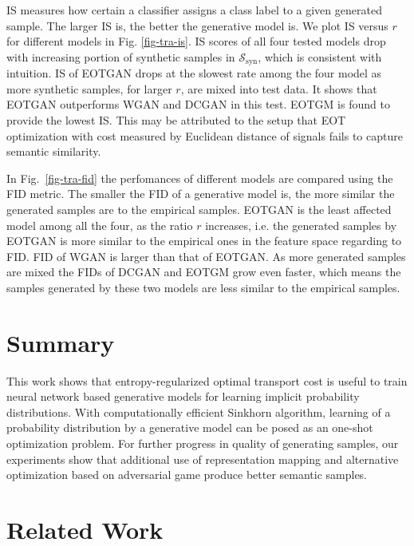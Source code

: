 IS measures how certain a classifier assigns a class label to a given
generated sample. The larger IS is, the better the generative model
is. We plot IS versus $r$ for different models in
Fig. \ref{fig-tra-is}. IS scores of all four tested models drop with
increasing portion of synthetic samples in
$\mathcal{S}_{\mathrm{syn}}$, which is consistent with intuition. IS
of EOTGAN drops at the slowest rate among the four model as more
synthetic samples, for larger $r$, are mixed into test data. It shows
that EOTGAN outperforms WGAN and DCGAN in this test. EOTGM is found to provide the lowest IS.
This may be attributed to the setup that 
EOT optimization with cost measured by Euclidean distance of signals
fails to capture semantic similarity.

In Fig.~\ref{fig-tra-fid} the perfomances of different models are
compared using the FID metric. The smaller the FID of a generative model is, the more similar the
generated samples are to the empirical samples. EOTGAN is the least affected model among all the four, as the ratio $r$ increases, i.e. the generated samples by EOTGAN is more similar to the empirical
ones in the feature space regarding to FID. FID of WGAN is larger than that of EOTGAN. As
more generated samples are mixed the FIDs of DCGAN and EOTGM grow
even faster, which means the samples generated by these two models are
less similar to the empirical samples.
\section{Summary}
This work shows that entropy-regularized optimal transport cost is
useful to train neural network based generative models for learning implicit probability
distributions. With computationally efficient Sinkhorn algorithm,
learning of a probability distribution by a generative model can be
posed as an one-shot optimization problem. For further progress in
quality of generating samples, our experiments show that additional use of
representation mapping and alternative optimization based on
adversarial game produce better
semantic samples. 


\section{Related Work}



